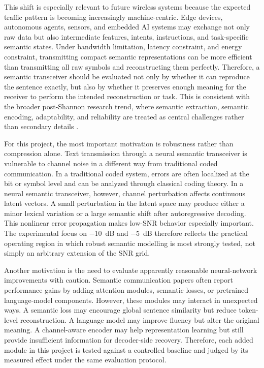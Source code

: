 This shift is especially relevant to future wireless systems because the expected traffic pattern is becoming increasingly machine-centric. Edge devices, autonomous agents, sensors, and embedded AI systems may exchange not only raw data but also intermediate features, intents, instructions, and task-specific semantic states. Under bandwidth limitation, latency constraint, and energy constraint, transmitting compact semantic representations can be more efficient than transmitting all raw symbols and reconstructing them perfectly. Therefore, a semantic transceiver should be evaluated not only by whether it can reproduce the sentence exactly, but also by whether it preserves enough meaning for the receiver to perform the intended reconstruction or task. This is consistent with the broader post-Shannon research trend, where semantic extraction, semantic encoding, adaptability, and reliability are treated as central challenges rather than secondary details \cite{liu2024survey_dcn, zhang2024semantic_nso}.

For this project, the most important motivation is robustness rather than compression alone. Text transmission through a neural semantic transceiver is vulnerable to channel noise in a different way from traditional coded communication. In a traditional coded system, errors are often localized at the bit or symbol level and can be analyzed through classical coding theory. In a neural semantic transceiver, however, channel perturbation affects continuous latent vectors. A small perturbation in the latent space may produce either a minor lexical variation or a large semantic shift after autoregressive decoding. This nonlinear error propagation makes low-SNR behavior especially important. The experimental focus on \SI{-10}{dB} and \SI{-5}{dB} therefore reflects the practical operating region in which robust semantic modelling is most strongly tested, not simply an arbitrary extension of the SNR grid.

Another motivation is the need to evaluate apparently reasonable neural-network improvements with caution. Semantic communication papers often report performance gains by adding attention modules, semantic losses, or pretrained language-model components. However, these modules may interact in unexpected ways. A semantic loss may encourage global sentence similarity but reduce token-level reconstruction. A language model may improve fluency but alter the original meaning. A channel-aware encoder may help representation learning but still provide insufficient information for decoder-side recovery. Therefore, each added module in this project is tested against a controlled baseline and judged by its measured effect under the same evaluation protocol.

